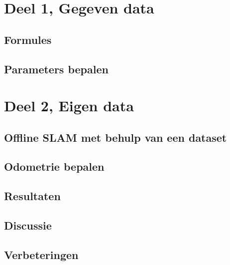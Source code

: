 \documentclass[a4paper]{article}
\begin{document}
\section{Deel 1, Gegeven data}
\subsection{Formules}
\subsection{Parameters bepalen}
\section{Deel 2, Eigen data}
\subsection{Offline SLAM met behulp van een dataset}
\subsection{Odometrie bepalen}
\subsection{Resultaten}
\subsection{Discussie}
\subsection{Verbeteringen}
\end{document}
